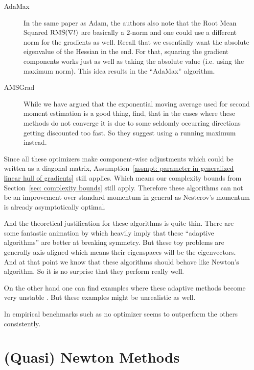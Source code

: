 \begin{description}
	\item[AdaMax] \parencite{kingmaAdamMethodStochastic2017} In the same paper
	as Adam, the authors also note that the Root Mean Squared
	\(\text{RMS}(\nabla l)\) are basically a \(2\)-norm and one could use a
	different norm for the gradients as well.  Recall that we essentially want
	the absolute eigenvalue of the Hessian in the end. For that, squaring
	the gradient components works just as well as taking the absolute value (i.e.
	using the maximum norm). This idea results in the ``AdaMax'' algorithm.

	\item[AMSGrad] \parencite{reddiConvergenceAdam2019} While we have argued that
	the exponential moving average used for second moment estimation is a good
	thing, \textcite{reddiConvergenceAdam2019} find, that in the cases where
	these methods do not converge it is due to some seldomly occurring directions
	getting discounted too fast. So they suggest using a running maximum instead.
\end{description}

Since all these optimizers make component-wise adjustments which could be written
as a diagonal matrix, Assumption~\ref{assmpt: parameter in generalized linear
hull of gradients} still applies. Which means our complexity bounds from
Section~\ref{sec: complexity bounds} still apply. Therefore these algorithms
can not be an improvement over standard momentum in general as Nesterov's
momentum is already asymptotically optimal.

And the theoretical justification for these algorithms is quite thin. There
are some fantastic animation by \textcite{radfordVisualizingOptimizationAlgos2014}
which heavily imply that these ``adaptive algorithms'' are better at breaking
symmetry. But these toy problems are generally axis aligned which means their
eigenspaces will be the eigenvectors. And at that point we know that these
algorithms should behave like Newton's algorithm. So it is no surprise that they
perform really well.

On the other hand one can find examples where these adaptive methods become very
unstable
\parencite[e.g.][]{wilsonMarginalValueAdaptive2018,reddiConvergenceAdam2019}.
But these examples might be unrealistic as well.

In empirical benchmarks such as \textcite{schmidtDescendingCrowdedValley2021} no
optimizer seems to outperform the others consistently.


\section{(Quasi) Newton Methods}

